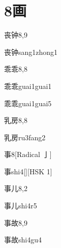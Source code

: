 
\section*{8画}

\begin{entry}{丧钟}{8,9}
  \begin{phonetics}{丧钟}{sang1zhong1}
  \end{phonetics}
\end{entry}

\begin{entry}{乖乖}{8,8}
  \begin{phonetics}{乖乖}{guai1guai1}
  \end{phonetics}
  \begin{phonetics}{乖乖}{guai1guai5}
  \end{phonetics}
\end{entry}

\begin{entry}{乳房}{8,8}
  \begin{phonetics}{乳房}{ru3fang2}
  \end{phonetics}
\end{entry}

\begin{entry}{事}{8}[Radical 亅]
  \begin{phonetics}{事}{shi4}[][HSK 1]
  \end{phonetics}
\end{entry}

\begin{entry}{事儿}{8,2}
  \begin{phonetics}{事儿}{shi4r5}
  \end{phonetics}
\end{entry}

\begin{entry}{事故}{8,9}
  \begin{phonetics}{事故}{shi4gu4}
  \end{phonetics}
\end{entry}


